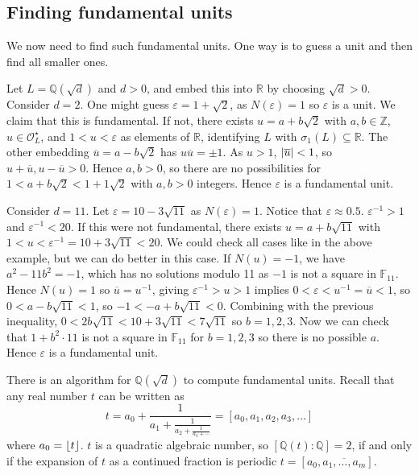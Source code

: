 \subsection{Finding fundamental units}
We now need to find such fundamental units.
One way is to guess a unit and then find all smaller ones.
\begin{example}
    Let \( L = \mathbb Q(\sqrt{d}) \) and \( d > 0 \), and embed this into \( \mathbb R \) by choosing \( \sqrt{d} > 0 \).
    Consider \( d = 2 \).
    One might guess \( \varepsilon = 1 + \sqrt{2} \), as \( N(\varepsilon) = 1 \) so \( \varepsilon \) is a unit.
    We claim that this is fundamental.
    If not, there exists \( u = a + b\sqrt{2} \) with \( a, b \in \mathbb Z \), \( u \in \mathcal O_L^\star \), and \( 1 < u < \varepsilon \) as elements of \( \mathbb R \), identifying \( L \) with \( \sigma_1(L) \subseteq \mathbb R \).
    The other embedding \( \overline u = a - b\sqrt{2} \) has \( u \overline u = \pm 1 \).
    As \( u > 1 \), \( \abs{\overline u} < 1 \), so \( u + \overline u, u - \overline u > 0 \).
    Hence \( a, b > 0 \), so there are no possibilities for \( 1 < a + b \sqrt{2} < 1 + 1 \sqrt{2} \) with \( a, b > 0 \) integers.
    Hence \( \varepsilon \) is a fundamental unit.
\end{example}
\begin{example}
    Consider \( d = 11 \).
    Let \( \varepsilon = 10 - 3\sqrt{11} \) as \( N(\varepsilon) = 1 \).
    Notice that \( \varepsilon \approx 0.5 \).
    \( \varepsilon^{-1} > 1 \) and \( \varepsilon^{-1} < 20 \).
    If this were not fundamental, there exists \( u = a + b \sqrt{11} \) with \( 1 < u < \varepsilon^{-1} = 10 + 3\sqrt{11} < 20 \).
    We could check all cases like in the above example, but we can do better in this case.
    If \( N(u) = -1 \), we have \( a^2 - 11b^2 = -1 \), which has no solutions modulo 11 as \( -1 \) is not a square in \( \mathbb F_{11} \).
    Hence \( N(u) = 1 \) so \( \overline u = u^{-1} \), giving \( \varepsilon^{-1} > u > 1 \) implies \( 0 < \varepsilon < u^{-1} = \overline u < 1 \), so \( 0 < a - b \sqrt{11} < 1 \), so \( -1 < -a + b \sqrt{11} < 0 \).
    Combining with the previous inequality, \( 0 < 2b \sqrt{11} < 10 + 3\sqrt{11} < 7 \sqrt{11} \) so \( b = 1, 2, 3 \).
    Now we can check that \( 1 + b^2 \cdot 11 \) is not a square in \( \mathbb F_{11} \) for \( b = 1, 2, 3 \) so there is no possible \( a \).
    Hence \( \varepsilon \) is a fundamental unit.
\end{example}
\begin{remark}
    There is an algorithm for \( \mathbb Q(\sqrt{d}) \) to compute fundamental units.
    Recall that any real number \( t \) can be written as
    \[ t = a_0 + \frac{1}{a_1 + \frac{1}{a_2 + \frac{1}{a_3 + \cdots}}} = [a_0, a_1, a_2, a_3, \dots] \]
    where \( a_0 = \lfloor t\rfloor \).
    \( t \) is a quadratic algebraic number, so \( [\mathbb Q(t) : \mathbb Q] = 2 \), if and only if the expansion of \( t \) as a continued fraction is periodic \( t = [a_0, \overline{a_1, \dots, a_m}] \).
\end{remark}

